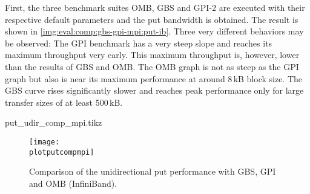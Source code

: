 First, the three benchmark suites \ac{OMB}, \ac{GBS} and \ac{GPI}-2 are executed with their respective default parameters and the put bandwidth is obtained. The result is shown in \autoref{img:eval:comp:gbs-gpi-mpi:put-ib}. Three very different behaviors may be observed: The \ac{GPI} benchmark has a very steep slope and reaches its maximum throughput very early. This maximum throughput is, however, lower than the results of \ac{GBS} and \ac{OMB}. The \ac{OMB} graph is not as steep as the \ac{GPI} graph but also is near its maximum performance at around 8\,kB block size. The \ac{GBS} curve rises significantly slower and reaches peak performance only for large transfer sizes of at least 500\,kB. 


\newcommand{\plotputcompmpi}{put_udir_comp_mpi.tikz}
\begin{filecontents}{\plotputcompmpi}

\newcommand{\csvgpiib}{result-gpi/gpi-ib-put.csv}
\newcommand{\csvombib}{result-omb/osu-ib-osu_put_bw.csv}
\newcommand{\csvgbsib}{result-ib/gbs_ubench_put_single_udir.csv}

\end{filecontents}

\begin{figure}[htb]
\centering
\texttt{[image: \\plotputcompmpi]}
\caption{Comparison of the unidirectional put performance with \acs{GBS}, \acs{GPI} and \acs{OMB} (InfiniBand).}
\label{img:eval:comp:gbs-gpi-mpi:put-ib}
\end{figure}

